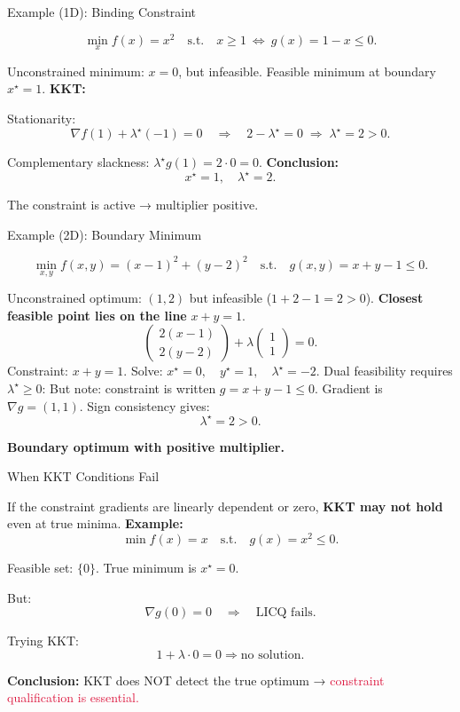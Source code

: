 \documentclass[aspectratio=169]{beamer}
\begin{document}
\begin{frame}{Example (1D): Binding Constraint}

\[
\min_x f(x)=x^2
\quad\text{s.t.}\quad x\ge 1 \ \Leftrightarrow\ g(x)=1-x\le 0.
\]

Unconstrained minimum: \(x=0\), but infeasible.  
Feasible minimum at boundary \(x^\star=1\).
\pause
\textbf{KKT:}

Stationarity:
\[
\nabla f(1) + \lambda^\star(-1) = 0
\quad\Rightarrow\quad
2 - \lambda^\star = 0
\; \Rightarrow\;
\lambda^\star = 2>0.
\]

Complementary slackness:
\(
\lambda^\star g(1)=2\cdot 0=0.
\)
\pause
\textbf{Conclusion:}  
\[
x^\star=1,\quad 
\lambda^\star=2.
\]

The constraint is active → multiplier positive.

\end{frame}

\begin{frame}{Example (2D): Boundary Minimum}

\[
\min_{x,y} f(x,y)=(x-1)^2 + (y-2)^2
\quad\text{s.t.}\quad g(x,y)=x+y-1\le 0.
\]

Unconstrained optimum: \((1,2)\) but infeasible  
(\(1+2-1=2>0\)).
\pause
\textbf{Closest feasible point lies on the line}  $
x+y=1.
$
$$
\begin{pmatrix}
2(x-1)\\[2pt]
2(y-2)
\end{pmatrix}
+ \lambda 
\begin{pmatrix}
1\\ 1
\end{pmatrix}
=0.
$$
\pause
Constraint:
$
x+y=1.
$
Solve:
$
x^\star=0,\quad y^\star=1,\quad \lambda^\star= -2.
$
\pause
Dual feasibility requires \(\lambda^\star\ge 0\):  
But note: constraint is written \(g=x+y-1\le 0\).  
Gradient is \(\nabla g=(1,1)\).  
Sign consistency gives:
\[
\lambda^\star = 2 >0.
\]

\textbf{Boundary optimum with positive multiplier.}

\end{frame}

\begin{frame}{When KKT Conditions Fail}

If the constraint gradients are linearly dependent or zero,  
\textbf{KKT may not hold} even at true minima.
\pause
\textbf{Example:}
\[
\min f(x)=x 
\quad\text{s.t.}\quad g(x)=x^2\le 0.
\]

Feasible set: \(\{0\}\).  
True minimum is \(x^\star=0\).  

But:
\[
\nabla g(0)=0 \quad\Rightarrow\quad \text{LICQ fails.}
\]

Trying KKT:
\[
1 + \lambda \cdot 0 = 0 \Rightarrow \text{no solution}.
\]

\textbf{Conclusion:}  
KKT does NOT detect the true optimum →  
\textcolor{Crimson}{constraint qualification is essential.}

\end{frame}
\end{document}
